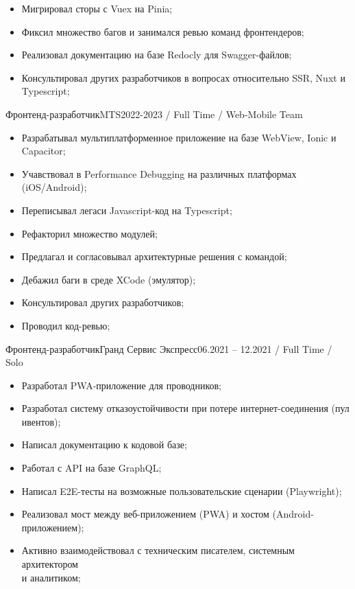 \documentclass[a4paper,12pt]{article}
\begin{document}
\begin{minipage}[t]{1\textwidth}
    \begin{itemize}[leftmargin=*]
    \item Мигрировал сторы с Vuex на Pinia;
      \item Фиксил множество багов и занимался ревью команд фронтендеров;
      \item Реализовал документацию на базе Redocly для Swagger-файлов;
      \item Консультировал других разработчиков в вопросах относительно SSR, Nuxt и Typescript;
        \end{itemize}

\vspace*{0.8em}

\begin{ExperienceBlock}{Фронтенд-разработчик}{MTS}{2022-2023 / Full Time / Web-Mobile Team}
    \begin{itemize}[leftmargin=*]
      \item Разрабатывал мультиплатформенное приложение на базе WebView, Ionic и Capacitor;
     \item Учавствовал в Performance Debugging на различных платформах (iOS/Android);
    \item Переписывал легаси Javascript-код на Typescript;
    \item Рефакторил множество модулей;
    \item Предлагал и согласовывал архитектурные решения с командой;
    \item Дебажил баги в среде XCode (эмулятор);
    \item Консультировал других разработчиков;
    \item Проводил код-ревью;
    \end{itemize}
\end{ExperienceBlock}




\begin{ExperienceBlock}{Фронтенд-разработчик}{Гранд Сервис Экспресс}{06.2021 -- 12.2021 / Full Time / Solo}
  \begin{itemize}[leftmargin=*]
    \item Разработал PWA-приложение для проводников;
    \item Разработал систему отказоустойчивости при потере интернет-соединения (пул ивентов);
    \item Написал документацию к кодовой базе;
    \item Работал с API на базе GraphQL;
    \item Написал E2E-тесты на возможные пользовательские сценарии (Playwright);
    \item Реализовал мост между веб-приложением (PWA) и хостом (Android-приложением);
    \item Активно взаимодействовал с техническим писателем, системным архитектором \\ и аналитиком;
  \end{itemize}
\end{ExperienceBlock}


\end{minipage}
\end{document}
